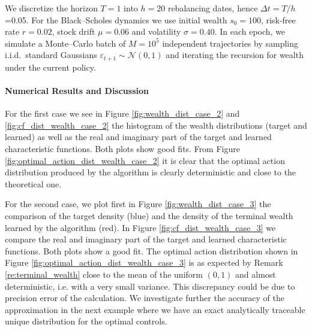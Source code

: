 \documentclass[reqno, 11pt]{amsart}%
\theoremstyle{definition}
\begin{document}
We discretize the horizon $T=1$ into $h=20$ rebalancing dates, hence $\Delta t = T/h$=0.05.
For the Black--Scholes dynamics we use initial wealth $s_0=100$, risk-free rate $r=0.02$, stock drift $\mu=0.06$ and volatility $\sigma=0.40$.
In each epoch, we simulate a Monte--Carlo batch of $M=10^5$ independent trajectories by sampling i.i.d.\ standard Gaussians
$\varepsilon_{t+1}\sim\mathcal N(0,1)$ and iterating the recursion for wealth under the current policy.


\paragraph{Numerical Results and Discussion} 

For the first  case we see in Figure \ref{fig:wealth_dist_case_2} and \ref{fig:cf_dist_wealth_case_2}  the histogram of the wealth distributions (target and learned) as well as the real and imaginary part of the target and learned characteristic functions. Both plots show good fits.  From Figure  %
\ref{fig:optimal_action_dist_wealth_case_2} it is clear that the optimal action distribution produced by the algorithm is clearly deterministic and close to the theoretical one. 

For the second case, we plot first in Figure \ref{fig:wealth_dist_case_3} the comparison of the target density (blue) and the density of the terminal wealth learned by the algorithm (red). In Figure \ref{fig:cf_dist_wealth_case_3} we compare the real and imaginary part of the target and learned characteristic functions. Both plots show a good fit.
The optimal action distribution shown in Figure \ref{fig:optimal_action_dist_wealth_case_3} is as expected by Remark \ref{re:terminal_wealth} close to the mean of the uniform $(0,1)$ and almost deterministic, i.e. with a very small variance. This discrepancy could be due to precision error of the calculation. We investigate further the accuracy of the approximation in the next example where we have an exact analytically traceable unique distribution for the optimal controls.    
\end{document}
